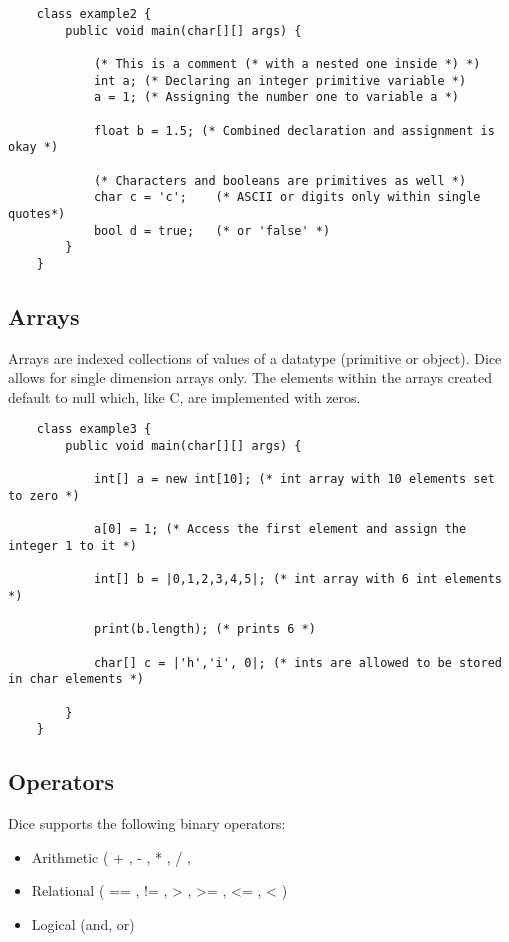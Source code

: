 \begin{homeworkProblem}
	\begin{verbatim}
	class example2 {
		public void main(char[][] args) {

			(* This is a comment (* with a nested one inside *) *)
			int a; (* Declaring an integer primitive variable *)
			a = 1; (* Assigning the number one to variable a *)

			float b = 1.5; (* Combined declaration and assignment is okay *)

			(* Characters and booleans are primitives as well *)
			char c = 'c';    (* ASCII or digits only within single quotes*)
			bool d = true;   (* or 'false' *)
		}
	}
	\end{verbatim}

	\subsection{Arrays}
	Arrays are indexed collections of values of a datatype (primitive or object). Dice allows for single dimension arrays only. The elements within the arrays created default to null which, like C, are implemented with zeros.

	\begin{verbatim}
	class example3 {
		public void main(char[][] args) {

			int[] a = new int[10]; (* int array with 10 elements set to zero *)

			a[0] = 1; (* Access the first element and assign the integer 1 to it *)
			
			int[] b = |0,1,2,3,4,5|; (* int array with 6 int elements *)

			print(b.length); (* prints 6 *)

			char[] c = |'h','i', 0|; (* ints are allowed to be stored in char elements *) 

		}
	}
	\end{verbatim}

	\subsection{Operators}
	Dice supports the following binary operators:
	\begin{itemize}
		\item Arithmetic ( + , - , * , / , %
		\item Relational ( == , != , > , >= , <= , < )
		\item Logical (and, or)
	\end{itemize}


\end{homeworkProblem}
